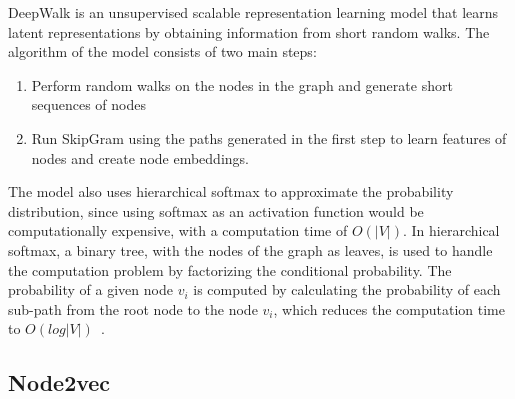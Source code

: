 DeepWalk is an unsupervised scalable representation learning model that learns latent representations by obtaining information from short random walks.
The algorithm of the model consists of two main steps:
\begin{enumerate}[1.]
    \item Perform random walks on the nodes in the graph and generate short sequences of nodes
    \item Run SkipGram using the paths generated in the first step to learn features of nodes and create node embeddings.
\end{enumerate}
The model also uses hierarchical softmax to approximate the probability distribution, since using softmax as an activation function would be computationally expensive, with a computation time of $O(|V|)$.
In hierarchical softmax, a binary tree, with the nodes of the graph as leaves, is used to handle the computation problem by factorizing the conditional probability.
The probability of a given node $v_{i}$ is computed by calculating the probability of each sub-path from the root node to the node $v_{i}$, which reduces the computation time to $O(log|V|)$~\cite{perozzi_deepwalk:_2014}.
\begin{figure}[!ht]
\end{figure}


\subsection{Node2vec}\label{subsection:node2vec}

